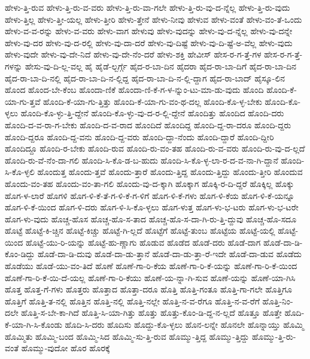 {ಹೇಳು-ತ್ತಿ-ರುವ
ಹೇಳು-ತ್ತಿ-ರು-ವ-ವರು
ಹೇಳು-ತ್ತಿ-ರು-ವಾ-ಗಲೇ
ಹೇಳು-ತ್ತಿ-ರು-ವು-ದ-ನ್ನೆಲ್ಲ
ಹೇಳು-ತ್ತಿ-ರು-ವುದು
ಹೇಳು-ತ್ತಿಲ್ಲ
ಹೇಳು-ತ್ತೀ-ಯಲ್ಲ
ಹೇಳು-ತ್ತೀರಿ
ಹೇಳು-ತ್ತೇನೆ
ಹೇಳು-ನೀವು
ಹೇಳುವ
ಹೇಳು-ವಂತೆ
ಹೇಳು-ವಂ-ತೆ-ಒಂದು
ಹೇಳು-ವ-ವ-ರನ್ನು
ಹೇಳು-ವ-ವರು
ಹೇಳು-ವಾಗ
ಹೇಳುವು
ಹೇಳು-ವುದನ್ನು
ಹೇಳು-ವು-ದ-ನ್ನೆಲ್ಲ
ಹೇಳು-ವು-ದನ್ನೇ
ಹೇಳು-ವು-ದರ
ಹೇಳು-ವು-ದ-ರಲ್ಲಿ
ಹೇಳು-ವು-ದಾ-ದರೆ
ಹೇಳು-ವು-ದಿಷ್ಟೆ
ಹೇಳು-ವು-ದಿ-ಷ್ಟೆ-ಅ-ವೆಲ್ಲ
ಹೇಳು-ವುದು
ಹೇಳು-ವುದೇ
ಹೇಳು-ವು-ದೇ-ನಿದೆ
ಹೇಳು-ವು-ದೇ-ನೆಂ-ದರೆ
ಹೇಳು-ಶಕ್ತಿ
ಹೇವೀಸ್
ಹೇಸ-ರ-ಗ-ತ್ತೆ-ಗಳ
ಹೇಸ-ರ-ಗ-ತ್ತೆ-ಗಳನ್ನು
ಹೇಸು-ವು-ದಿ-ಲ್ಲ-ವಲ್ಲ
ಹೈ
ಹೈಡೆ-ಲ್ಬರ್ಗ್ಗೆ
ಹೈದ-ರ-ಬಾ-ದಿನ
ಹೈದರಾ
ಹೈದ-ರಾ-ಬಾ-ದಿಗೆ
ಹೈದ-ರಾ-ಬಾ-ದಿನ
ಹೈದ-ರಾ-ಬಾ-ದಿ-ನಲ್ಲಿ
ಹೈದ-ರಾ-ಬಾ-ದಿ-ನ-ಲ್ಲಿದ್ದ
ಹೈದ-ರಾ-ಬಾ-ದಿ-ನ-ಲ್ಲಿ-ದ್ದಾಗ
ಹೈದ-ರಾ-ಬಾದ್
ಹೈಸ್ಕೂ-ಲಿನ
ಹೊಂದ
ಹೊಂದ-ಬೇ-ಕೆಂಬ
ಹೊಂದಾ-ಣಿಕೆ
ಹೊಂದಾ-ಣಿ-ಕೆ-ಗ-ಳ-ನ್ನುಂ-ಟು-ಮಾ-ಡು-ವುದು
ಹೊಂದಿ
ಹೊಂದಿ-ಕೆ-ಯಾ-ಗು-ತ್ತವೆ
ಹೊಂದಿ-ಕೆ-ಯಾ-ಗು-ತ್ತಿತ್ತು
ಹೊಂದಿ-ಕೆ-ಯಾ-ಗು-ವಂ-ಥ-ದಲ್ಲ
ಹೊಂದಿ-ಕೊ-ಳ್ಳ-ಬೇಕು
ಹೊಂದಿ-ಕೊ-ಳ್ಳಲು
ಹೊಂದಿ-ಕೊ-ಳ್ಳು-ತ್ತಿ-ದ್ದೇನೆ
ಹೊಂದಿ-ಕೊ-ಳ್ಳು-ವು-ದ-ರ-ಲ್ಲಿ-ದ್ದೇನೆ
ಹೊಂದಿತ್ತು
ಹೊಂದಿದ
ಹೊಂದಿ-ದರು
ಹೊಂದಿ-ದ-ವ-ರಾ-ಗ-ಬೇಕು
ಹೊಂದಿ-ದ-ವ-ರಾದ
ಹೊಂದಿದೆ
ಹೊಂದಿದ್ದ
ಹೊಂದಿ-ದ್ದ-ರಾ-ದರೂ
ಹೊಂದಿ-ದ್ದರು
ಹೊಂದಿ-ದ್ದರೂ
ಹೊಂದಿ-ದ್ದ-ವನು
ಹೊಂದಿ-ದ್ದ-ವರು
ಹೊಂದಿ-ದ್ದಾ-ನೆಂದು
ಹೊಂದಿ-ದ್ದಾರೆ
ಹೊಂದಿ-ದ್ದೀರಿ
ಹೊಂದಿದ್ದೂ
ಹೊಂದಿ-ರ-ಬೇಕು
ಹೊಂದಿ-ರುವ
ಹೊಂದಿ-ರು-ವಂ-ತಹ
ಹೊಂದಿ-ರು-ವ-ವರು
ಹೊಂದಿ-ರು-ವು-ದ-ಲ್ಲದೆ
ಹೊಂದಿ-ರು-ವೆ-ನೆಂ-ದಾ-ಗಲಿ
ಹೊಂದಿ-ಸಿ-ಕೊ-ಡ-ಬ-ಹುದು
ಹೊಂದಿ-ಸಿ-ಕೊ-ಳ್ಳ-ಲಾ-ರ-ದ-ವ-ನಾ-ಗಿ-ದ್ದಾನೆ
ಹೊಂದಿ-ಸಿ-ಕೊ-ಳ್ಳಲಿ
ಹೊಂದುತ್ತ
ಹೊಂದು-ತ್ತವೆ
ಹೊಂದು-ತ್ತಾರೆ
ಹೊಂದು-ತ್ತಿದ್ದ
ಹೊಂದು-ತ್ತಿದ್ದು
ಹೊಂದು-ತ್ತೀರಿ
ಹೊಂದುವ
ಹೊಂದು-ವಂ-ತಹ
ಹೊಂದು-ವಂ-ತಾ-ಗಲಿ
ಹೊಂದು-ವು-ದ-ಕ್ಕಾಗಿ
ಹೊಕ್ಕಾಗ
ಹೊಕ್ಕಿ-ರ-ದಿ-ದ್ದರೆ
ಹೊಕ್ಕಿಲ್ಲ
ಹೊಕ್ಕು
ಹೊಗ-ಳ-ಲಾರೆ
ಹೊಗಳಿ
ಹೊಗ-ಳಿ-ಕೆ-ತೆ-ಗ-ಳಿ-ಕೆ-ಗ-ಳಿಗೆ
ಹೊಗ-ಳಿ-ಕೆ-ಗಳು
ಹೊಗ-ಳಿ-ಕೆಯ
ಹೊಗ-ಳಿ-ಕೆ-ಯನ್ನೂ
ಹೊಗ-ಳಿ-ಕೆ-ಯಿಂದ
ಹೊಗ-ಳಿ-ದರು
ಹೊಗ-ಳಿ-ಸಿ-ಕೊ-ಳ್ಳಲು
ಹೊಗ-ಳುತ್ತ
ಹೊಗ-ಳು-ಭ-ಟರು
ಹೊಗ-ಳು-ಭ-ಟರೇ
ಹೊಗ-ಳು-ವುದು
ಹೊಚ್ಚ-ಹೊಸ
ಹೊಚ್ಚ-ಹೊ-ಸ-ತಾದ
ಹೊಚ್ಚ-ಹೊ-ಸ-ದಾ-ಗಿ-ರು-ತ್ತಿ-ದ್ದುವು
ಹೊಚ್ಚ-ಹೊ-ಸದೂ
ಹೊಟ್ಟೆ
ಹೊಟ್ಟೆ-ಕಿ-ಚ್ಚಿನ
ಹೊಟ್ಟೆ-ಕಿಚ್ಚು
ಹೊಟ್ಟೆ-ಗಿ-ಲ್ಲದೆ
ಹೊಟ್ಟೆಗೆ
ಹೊಟ್ಟೆ-ತುಂಬ
ಹೊಟ್ಟೆಯ
ಹೊಟ್ಟೆ-ಯಲ್ಲಿ
ಹೊಟ್ಟೆ-ಯಿಂದ
ಹೊಟ್ಟೆ-ಯು-ರಿ-ಯನ್ನು
ಹೊಟ್ಟೆ-ಹು-ಣ್ಣಾಗು
ಹೊಡುವ
ಹೊಡೆದ
ಹೊಡೆ-ದರು
ಹೊಡೆ-ದಾಗ
ಹೊಡೆ-ದಾ-ಡಿ-ಕೊಂ-ಡಿದ್ದು
ಹೊಡೆ-ದಾ-ಡಿ-ದುವು
ಹೊಡೆ-ದಾ-ಡು-ತ್ತಾನೆ
ಹೊಡೆ-ದಾ-ಡು-ತ್ತಾ-ರೆ-ಇದೇ
ಹೊಡೆ-ದಾ-ಡುವ
ಹೊಡೆದು
ಹೊಡೆಯು
ಹೊಡೆ-ಯು-ವಂ-ತಿದೆ
ಹೊಣೆ
ಹೊಣೆ-ಗಾ-ರಿ-ಕೆಯ
ಹೊಣೆ-ಗಾ-ರಿ-ಕೆ-ಯನ್ನು
ಹೊಣೆ-ಗಾ-ರಿ-ಕೆ-ಯಿಂದ
ಹೊಣೆ-ಗಾ-ರಿ-ಕೆ-ಯಿ-ದೆ-ಯಲ್ಲ
ಹೊಣೆ-ಗಾ-ರಿ-ಕೆಯು
ಹೊಣೆ-ಯ-ನ್ನಾ-ಗಿ-ಸುವ
ಹೊಣೆ-ಯನ್ನು
ಹೊಣೆ-ಯಾ-ಗಿಸಿ
ಹೊತ್ತ
ಹೊತ್ತ-ಗೆ-ಗಳು
ಹೊತ್ತರು
ಹೊತ್ತಾದ
ಹೊತ್ತಾ-ದರೂ
ಹೊತ್ತಿ
ಹೊತ್ತಿ-ಗಂತೂ
ಹೊತ್ತಿ-ಗಾ-ಗಲೇ
ಹೊತ್ತಿಗೂ
ಹೊತ್ತಿಗೆ
ಹೊತ್ತಿ-ತ-ನಲ್ಲಿ
ಹೊತ್ತಿನ
ಹೊತ್ತಿ-ನಲ್ಲಿ
ಹೊತ್ತಿ-ನಲ್ಲೇ
ಹೊತ್ತಿ-ನ-ವ-ರೆಗೂ
ಹೊತ್ತಿ-ನ-ವ-ರೆಗೆ
ಹೊತ್ತಿ-ನಿಂ-ದಲೇ
ಹೊತ್ತಿ-ಸ-ಬೇ-ಕಾ-ಗಿದೆ
ಹೊತ್ತಿ-ಸಿ-ಯಾ-ಗಿತ್ತು
ಹೊತ್ತು
ಹೊತ್ತು-ಕೊಂ-ಡಿ-ದ್ದ-ನ-ಲ್ಲದೆ
ಹೊತ್ತೂ
ಹೊತ್ತೇ
ಹೊದಿ-ಕೆ-ಯಾ-ಗಿ-ಸಿ-ಕೊಂಡು
ಹೊದಿ-ಸಿ-ದರು
ಹೊದಿಸು
ಹೊದ್ದು-ಕೊ-ಳ್ಳಲು
ಹೊನ-ಲನ್ನೇ
ಹೊನಲೇ
ಹೊನ್ನಾಯ್ತು
ಹೊಮ್ಮಿ
ಹೊಮ್ಮಿತು
ಹೊಮ್ಮಿ-ಬಂದ
ಹೊಮ್ಮಿ-ಸಿದ
ಹೊಮ್ಮಿ-ಸು-ತ್ತಿ-ರುವ
ಹೊಮ್ಮು-ತ್ತಿದ್ದ
ಹೊಮ್ಮು-ತ್ತಿದ್ದು
ಹೊಮ್ಮು-ತ್ತಿ-ರು-ವಂತೆ
ಹೊಮ್ಮು-ವುದೋ
ಹೊರ
ಹೊರಕ್ಕೆ
}
